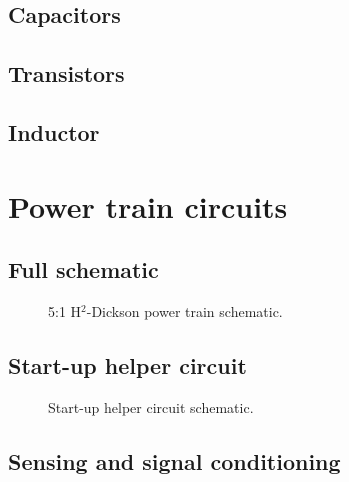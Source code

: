 \begin{table}[!h]
\subsection{Capacitors}
\subsection{Transistors}
\subsection{Inductor}

\section{Power train circuits}
\subsection{Full schematic}
\begin{figure}[!h]
\centering

\caption[Power train schematic]{5:1 H$^2$-Dickson power train schematic.}
\label{fig:pwr_train_sch}
\end{figure}



%

\subsection{Start-up helper circuit}
\begin{figure}[!h]
\centering

\caption[Start-up helper schematic]{Start-up helper circuit schematic.}
\label{fig:pwr_train_sch}
\end{figure}


\subsection{Sensing and signal conditioning}


\end{table}
